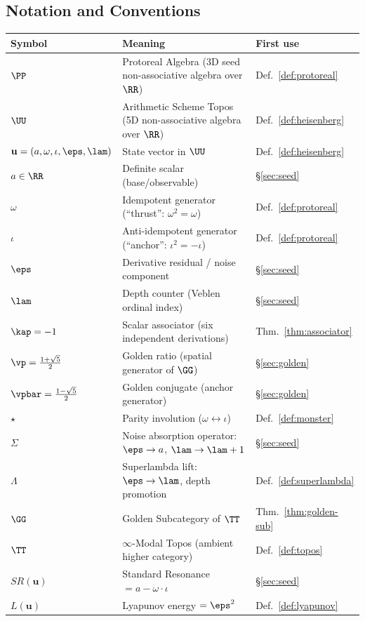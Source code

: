 \newpage

\subsection*{Notation and Conventions}

\begin{tabular}{@{}lll@{}}
\toprule
\textbf{Symbol} & \textbf{Meaning} & \textbf{First use} \\
\midrule
$\PP$ & Protoreal Algebra (3D seed non-associative algebra over $\RR$) & Def.~\ref{def:protoreal} \\
$\UU$ & Arithmetic Scheme Topos (5D non-associative algebra over $\RR$) & Def.~\ref{def:heisenberg} \\
$\mathbf{u} = (a, \omega, \iota, \eps, \lam)$ & State vector in $\UU$ & Def.~\ref{def:heisenberg} \\
$a \in \RR$ & Definite scalar (base/observable) & \S\ref{sec:seed} \\
$\omega$ & Idempotent generator (``thrust'': $\omega^2 = \omega$) & Def.~\ref{def:protoreal} \\
$\iota$ & Anti-idempotent generator (``anchor'': $\iota^2 = -\iota$) & Def.~\ref{def:protoreal} \\
$\eps$ & Derivative residual / noise component & \S\ref{sec:seed} \\
$\lam$ & Depth counter (Veblen ordinal index) & \S\ref{sec:seed} \\
$\kap = -1$ & Scalar associator (six independent derivations) & Thm.~\ref{thm:associator} \\
$\vp = \tfrac{1+\sqrt{5}}{2}$ & Golden ratio (spatial generator of $\GG$) & \S\ref{sec:golden} \\
$\vpbar = \tfrac{1-\sqrt{5}}{2}$ & Golden conjugate (anchor generator) & \S\ref{sec:golden} \\
$\star$ & Parity involution ($\omega \leftrightarrow \iota$) & Def.~\ref{def:monster} \\
$\Sigma$ & Noise absorption operator: $\eps \to a$, $\lam \to \lam+1$ & \S\ref{sec:seed} \\
$\Lambda$ & Superlambda lift: $\eps \to \lam$, depth promotion & Def.~\ref{def:superlambda} \\
$\GG$ & Golden Subcategory of $\TT$ & Thm.~\ref{thm:golden-sub} \\
$\TT$ & $\infty$-Modal Topos (ambient higher category) & Def.~\ref{def:topos} \\
$SR(\mathbf{u})$ & Standard Resonance $= a - \omega \cdot \iota$ & \S\ref{sec:seed} \\
$L(\mathbf{u})$ & Lyapunov energy $= \eps^2$ & Def.~\ref{def:lyapunov} \\
\bottomrule
\end{tabular}

